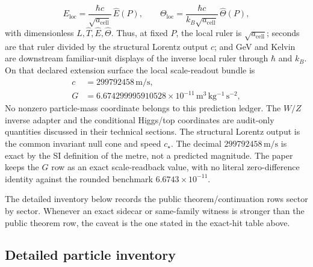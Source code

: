 \documentclass[11pt]{article}
\begin{document}
\[
E_{\mathrm{loc}}=\frac{\hbar c}{\sqrt{a_{\mathrm{cell}}}}\,\widehat E(P),
\qquad
\Theta_{\mathrm{loc}}=\frac{\hbar c}{k_B\sqrt{a_{\mathrm{cell}}}}\,\widehat\Theta(P),
\]
with dimensionless \(\widehat L,\widehat T,\widehat E,\widehat\Theta\). Thus, at fixed \(P\), the
local ruler is \(\sqrt{a_{\mathrm{cell}}}\); seconds are that ruler divided by the structural
Lorentz output \(c\); and GeV and Kelvin are downstream familiar-unit displays of the inverse
local ruler through \(\hbar\) and \(k_B\). On that declared extension
surface the local scale-readout bundle is
\[
\begin{aligned}
c&=299792458\,\mathrm{m/s},\\
G&=6.674299995910528\times10^{-11}\,\mathrm{m^3\,kg^{-1}\,s^{-2}},
\end{aligned}
\]
No nonzero particle-mass coordinate belongs to this prediction ledger. The \(W/Z\) inverse adapter
and the conditional Higgs/top coordinates are audit-only quantities discussed in their technical
sections. The structural Lorentz output is the common invariant null cone and speed
\(c_\star\). The decimal \(299792458\,\mathrm{m/s}\) is exact by the SI definition of the metre,
not a predicted magnitude. The paper keeps the
\(G\) row as an exact scale-readback value, with no literal zero-difference identity against the
rounded benchmark \(6.6743\times10^{-11}\).

The detailed inventory below records the public theorem/continuation rows sector by sector. Whenever an exact sidecar or same-family witness is stronger than the public theorem row, the caveat is the one stated in the exact-hit table above.

\subsection{Detailed particle inventory}
\end{document}
